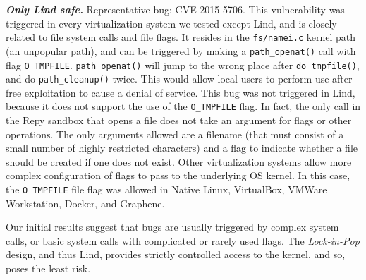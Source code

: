 {{{\emph{\textbf{Only Lind safe.}}  Representative bug: CVE-2015-5706.
This vulnerability was triggered in every virtualization system we tested except Lind,
and is closely related to file system calls and file flags. It resides in the \texttt{fs/namei.c}
kernel path (an unpopular path), and can be triggered by making a \texttt{path\_openat()}
call with flag \texttt{O\_TMPFILE}. \texttt{path\_openat()} will jump to the wrong
place after \texttt{do\_tmpfile()}, and do \texttt{path\_cleanup()} twice. This would
allow local users to perform use-after-free exploitation to cause a denial of service.
This bug was not triggered in Lind, because it does not support the use of the
\texttt{O\_TMPFILE} flag. In fact, the only call in the Repy sandbox that
opens a file does not take an argument for flags or other operations.  The
only arguments allowed are a filename (that must consist of a small number
of highly restricted characters) and a flag to indicate whether a file should
be created if one does not exist.
Other virtualization systems allow more complex configuration of flags to
pass to the underlying OS kernel.
In this case, the \texttt{O\_TMPFILE} file flag was
allowed in Native Linux, VirtualBox, VMWare Workstation, Docker, and Graphene.

Our initial results %
suggest that bugs are usually triggered by complex system calls, or basic system calls
with complicated or rarely used flags. The \emph{Lock-in-Pop} design, and thus Lind,
provides strictly controlled access to the kernel, and so, poses
the least risk.

}}}
